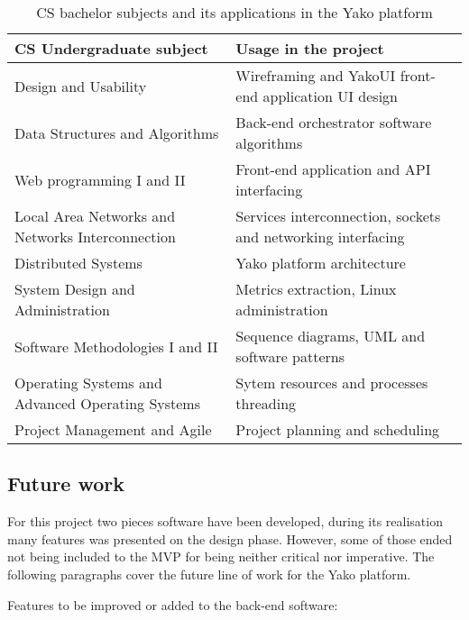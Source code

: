         \begin{table}[H]
            \centering
            \caption{CS bachelor subjects and its applications in the Yako platform}
            \begin{tabularx}{\linewidth}{|X|X|}
                \hline
                \rowcolor[HTML]{C0C0C0}
                \textbf{CS Undergraduate subject} & \textbf{Usage in the project} \\ \hline
                Design and Usability & Wireframing and YakoUI front-end application UI design \\ \hline
                Data Structures and Algorithms & Back-end orchestrator software algorithms \\ \hline
                Web programming I and II & Front-end application and API interfacing \\ \hline
                Local Area Networks and Networks Interconnection & Services interconnection, sockets and networking interfacing \\ \hline
                Distributed Systems & Yako platform architecture \\ \hline
                System Design and Administration & Metrics extraction, Linux administration \\ \hline
                Software Methodologies I and II & Sequence diagrams, UML and software patterns \\ \hline
                Operating Systems and Advanced Operating Systems & Sytem resources and processes threading \\ \hline
                Project Management and Agile & Project planning and scheduling \\ \hline
            \end{tabularx}
            \label{tab:concepts}
        \end{table}
        
    \subsection{Future work} \label{future_work}
        For this project two pieces software have been developed, during its realisation many features was presented on the design phase. However, some of those ended not being included to the MVP for being neither critical nor imperative. The following paragraphs cover the future line of work for the Yako platform.
        
        Features to be improved or added to the back-end software:
        
